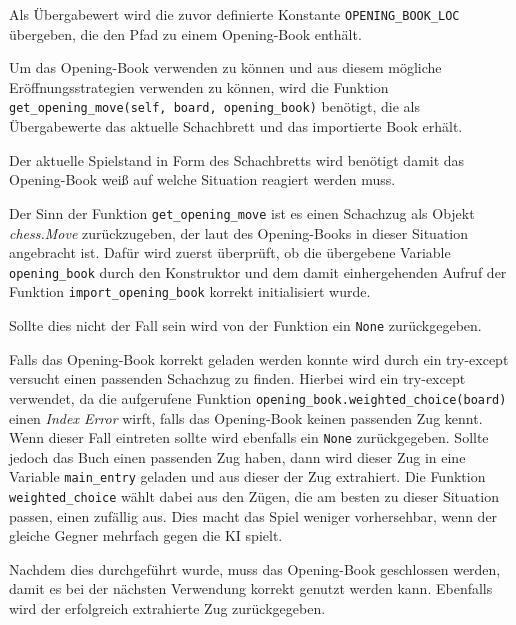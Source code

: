 Als Übergabewert wird die zuvor definierte Konstante
\texttt{OPENING\_BOOK\_LOC} übergeben, die den Pfad zu einem
Opening-Book enthält.

    Um das Opening-Book verwenden zu können und aus diesem mögliche
Eröffnungsstrategien verwenden zu können, wird die Funktion
\texttt{get\_opening\_move(self,\ board,\ opening\_book)} benötigt, die
als Übergabewerte das aktuelle Schachbrett und das importierte Book
erhält.

Der aktuelle Spielstand in Form des Schachbretts wird benötigt damit das
Opening-Book weiß auf welche Situation reagiert werden muss.

Der Sinn der Funktion \texttt{get\_opening\_move} ist es einen Schachzug
als Objekt \emph{chess.Move} zurückzugeben, der laut des Opening-Books
in dieser Situation angebracht ist. Dafür wird zuerst überprüft, ob die
übergebene Variable \texttt{opening\_book} durch den Konstruktor und dem
damit einhergehenden Aufruf der Funktion \texttt{import\_opening\_book}
korrekt initialisiert wurde.

Sollte dies nicht der Fall sein wird von der Funktion ein \texttt{None}
zurückgegeben.

Falls das Opening-Book korrekt geladen werden konnte wird durch ein
try-except versucht einen passenden Schachzug zu finden. Hierbei wird
ein try-except verwendet, da die aufgerufene Funktion
\texttt{opening\_book.weighted\_choice(board)} einen \emph{Index Error} wirft, falls
das Opening-Book keinen passenden Zug kennt. Wenn dieser Fall eintreten
sollte wird ebenfalls ein \texttt{None} zurückgegeben. Sollte jedoch das
Buch einen passenden Zug haben, dann wird dieser Zug in eine Variable
\texttt{main\_entry} geladen und aus dieser der Zug extrahiert.
 Die Funktion \texttt{weighted\_choice} wählt dabei aus den Zügen, die am besten 
 zu dieser Situation passen, einen zufällig aus. Dies macht das Spiel weniger
 vorhersehbar, wenn der gleiche Gegner mehrfach gegen die KI spielt.

Nachdem dies durchgeführt wurde, muss das Opening-Book geschlossen
werden, damit es bei der nächsten Verwendung korrekt genutzt werden
kann. Ebenfalls wird der erfolgreich extrahierte Zug zurückgegeben.


